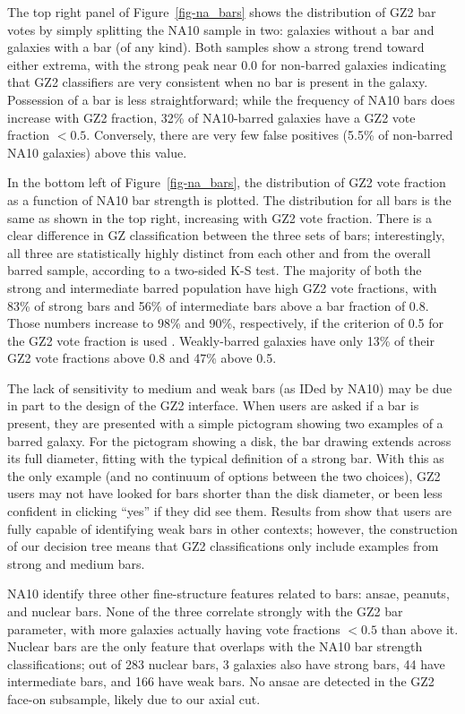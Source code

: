 \documentclass[useAMS,usenatbib]{mn2e}
\begin{document}
The top right panel of Figure~\ref{fig-na_bars} shows the distribution of GZ2 bar votes by simply splitting the NA10 sample in two: galaxies without a bar and galaxies with a bar (of any kind). Both samples show a strong trend toward either extrema, with the strong peak near 0.0 for non-barred galaxies indicating that GZ2 classifiers are very consistent when no bar is present in the galaxy. Possession of a bar is less straightforward; while the frequency of NA10 bars does increase with GZ2 fraction, 32\% of NA10-barred galaxies have a GZ2 vote fraction $<0.5$. Conversely, there are very few false positives (5.5\% of non-barred NA10 galaxies) above this value. 

In the bottom left of Figure~\ref{fig-na_bars}, the distribution of GZ2 vote fraction as a function of NA10 bar strength is plotted. The distribution for all bars is the same as shown in the top right, increasing with GZ2 vote fraction. There is a clear difference in GZ classification between the three sets of bars; interestingly, all three are statistically highly distinct from each other and from the overall barred sample, according to a two-sided K-S test. The majority of both the strong and intermediate barred population have high GZ2 vote fractions, with 83\% of strong bars and 56\% of intermediate bars above a bar fraction of 0.8. Those numbers increase to 98\% and 90\%, respectively, if the criterion of 0.5 for the GZ2 vote fraction is used \citep{mas11c}. Weakly-barred galaxies have only 13\% of their GZ2 vote fractions above 0.8 and 47\% above 0.5. 

The lack of sensitivity to medium and weak bars (as IDed by NA10) may be due in part to the design of the GZ2 interface. When users are asked if a bar is present, they are presented with a simple pictogram showing two examples of a barred galaxy. For the pictogram showing a disk, the bar drawing extends across its full diameter, fitting with the typical definition of a strong bar. With this as the only example (and no continuum of options between the two choices), GZ2 users may not have looked for bars shorter than the disk diameter, or been less confident in clicking ``yes'' if they did see them. Results from \citet{hoy11} show that users are fully capable of identifying weak bars in other contexts; however, the construction of our decision tree means that GZ2 classifications only include examples from strong and medium bars. 

NA10 identify three other fine-structure features related to bars: ansae, peanuts, and nuclear bars. None of the three correlate strongly with the GZ2 bar parameter, with more galaxies actually having vote fractions $<0.5$ than above it. Nuclear bars are the only feature that overlaps with the NA10 bar strength classifications; out of 283 nuclear bars, 3 galaxies also have strong bars, 44 have intermediate bars, and 166 have weak bars. No ansae are detected in the GZ2 face-on subsample, likely due to our axial cut. 
\end{document}
